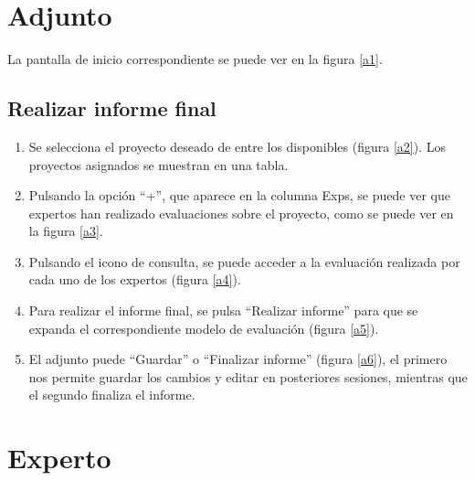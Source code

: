 \documentclass[12pt,a4paper,titlepage,spanish,twoside]{book}
\begin{document}
\section{Adjunto}
La pantalla de inicio correspondiente se puede ver en la figura \ref{a1}.

\subsection{Realizar informe final}
\begin{enumerate}
\item Se selecciona el proyecto deseado de entre los disponibles (figura 
  \ref{a2}). Los proyectos asignados se muestran en una tabla.
  

\item Pulsando la opción ``+'', que aparece en la columna Exps, se puede ver que
  expertos han realizado evaluaciones sobre el proyecto, como se puede ver en
  la figura \ref{a3}. 


\item Pulsando el icono de consulta, se puede acceder a la evaluación realizada 
  por cada uno de los expertos (figura \ref{a4}).


\item Para realizar el informe final, se pulsa ``Realizar informe'' 
  para que se expanda el correspondiente modelo de evaluación (figura \ref{a5}).
  

\item El adjunto puede ``Guardar'' o ``Finalizar informe'' 
  (figura \ref{a6}), el primero nos permite guardar los cambios y editar en 
  posteriores sesiones, mientras que el segundo finaliza el informe.
  
\end{enumerate}

\section{Experto}
\end{document}
